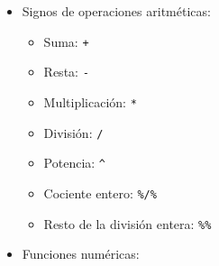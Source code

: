 \documentclass[]{book}
\providecommand{\tightlist}{%
  \setlength{\itemsep}{0pt}\setlength{\parskip}{0pt}}
\theoremstyle{definition}
\theoremstyle{definition}
\theoremstyle{definition}
\theoremstyle{remark}
\begin{document}
\begin{itemize}
\tightlist
\item
  Signos de operaciones aritméticas:

  \begin{itemize}
  \tightlist
  \item
    Suma: \texttt{+}
  \item
    Resta: \texttt{-}
  \item
    Multiplicación: \texttt{*}
  \item
    División: \texttt{/}
  \item
    Potencia: \texttt{\^{}}
  \item
    Cociente entero: \texttt{\%/\%}
  \item
    Resto de la división entera: \texttt{\%\%}
  \end{itemize}
\item
  Funciones numéricas:


\end{itemize}
\end{document}
